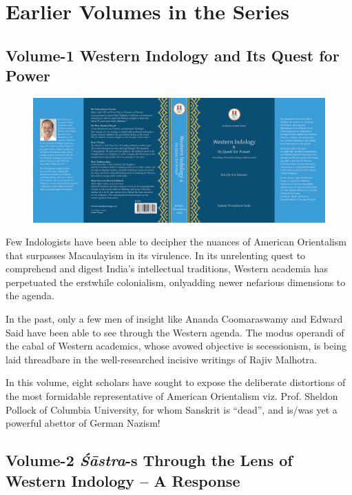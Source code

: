 \chapter*{Earlier Volumes in the Series}\label{evc}

\vspace{-1cm}

\section*{Volume-1 Western Indology and Its Quest for Power}

\begin{figure}[!htbp]
\includegraphics[scale=.727]{images/fig01.png}
\end{figure}

Few Indologists have been able to decipher the nuances of American Orientalism that surpasses Macaulayism in its virulence. In its unrelenting quest to comprehend and digest India’s intellectual traditions, Western academia has perpetuated the erstwhile colonialism, only\break adding newer nefarious dimensions to the agenda. 

In the past, only a few men of insight like Ananda Coomaraswamy and Edward Said have been able to see through the Western agenda. The modus operandi of the cabal of Western academics, whose avowed objective is secessionism, is being laid threadbare in the well-researched incisive writings of Rajiv Malhotra.

In this volume, eight scholars have sought to expose the deliberate distortions of the most formidable representative of American Orientalism viz. Prof. Sheldon Pollock of Columbia University, for whom Sanskrit is “dead”, and is/was yet a powerful abettor of German Nazism!


\section*{Volume-2 \textit{Śāstra}-s Through the Lens of Western Indology – A Response}

